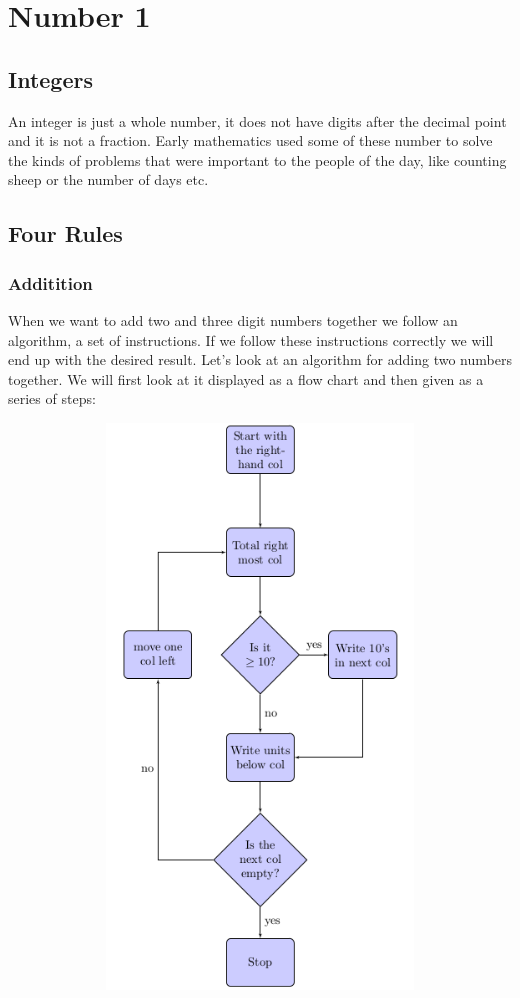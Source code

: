 \chapter{Number 1}
\section{Integers}
An integer is just a whole number, it does not have digits after the decimal point and it is not a fraction.  Early mathematics used some of these number to solve the kinds of problems that were important to the people of the day, like counting sheep or the number of days etc.
\section{Four Rules}
\subsection{Additition}
When we want to add two and three digit numbers together we follow an algorithm, a set of instructions.  If we follow these instructions correctly we will end up with the desired result.  Let's look at an algorithm for adding two numbers together.  We will first look at it displayed as a flow chart and then given as a series of steps:

\includegraphics[width=15cm,height=15cm,keepaspectratio]{./Images/Number/Flow1}

